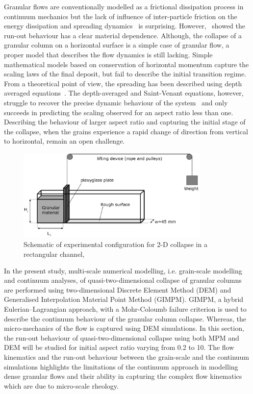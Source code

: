 Granular flows are conventionally modelled as a frictional dissipation process 
in continuum mechanics but the lack of influence of inter-particle friction on 
the energy dissipation and spreading dynamics~\citep{Lube2005} is surprising. 
However,~\citet{Kerswell2005} showed the run-out behaviour has a clear material 
dependence. Although, the collapse of a granular column on a 
horizontal surface is a simple case of granular flow, a proper model 
that describes the flow dynamics is still lacking. Simple mathematical models 
based on conservation of horizontal momentum capture the scaling laws of the 
final deposit, but fail to describe the initial transition regime. From a 
theoretical point of view, the spreading has been described using depth 
averaged equations~\citep{Kerswell2005,Larrieu2006}. The depth-averaged and 
Saint-Venant equations, however, struggle to recover the precise dynamic 
behaviour of the system~\citep{Warnett2013} and only succeeds in predicting the 
scaling observed for an aspect ratio less than one. Describing the behaviour of 
larger aspect ratio and capturing the initial stage of the collapse, when the 
grains experience a rapid change of direction from vertical to horizontal, 
remain an open challenge.


\begin{figure}[tbhp]
\centering
\includegraphics[width=0.85\textwidth]{experiment_setup}
\caption{Schematic of experimental configuration for 2-D collapse in a 
rectangular channel,~\citep{Lajeunesse2004}}
\label{fig:exp}
\end{figure}

In the present study, multi-scale numerical modelling, i.e. grain-scale 
modelling and continuum analyses, of quasi-two-dimensional collapse of 
granular columns are performed using two-dimensional Discrete Element Method 
(DEM) and Generalised Interpolation Material Point Method (GIMPM). GIMPM, a 
hybrid Eulerian--Lagrangian approach, with a Mohr-Coloumb failure criterion is 
used to describe the continuum behaviour of the granular column collapse. 
Whereas, the micro-mechanics of the flow is captured using DEM simulations. 
In this section, the run-out behaviour of quasi-two-dimensional collapse using 
both MPM and DEM will be studied for initial aspect ratio varying from 0.2 to 
10. The flow kinematics and the run-out behaviour between the grain-scale and 
the continuum simulations highlights the limitations of the continuum approach 
in modelling dense granular flows and their ability in capturing the complex 
flow kinematics which are due to micro-scale rheology.

